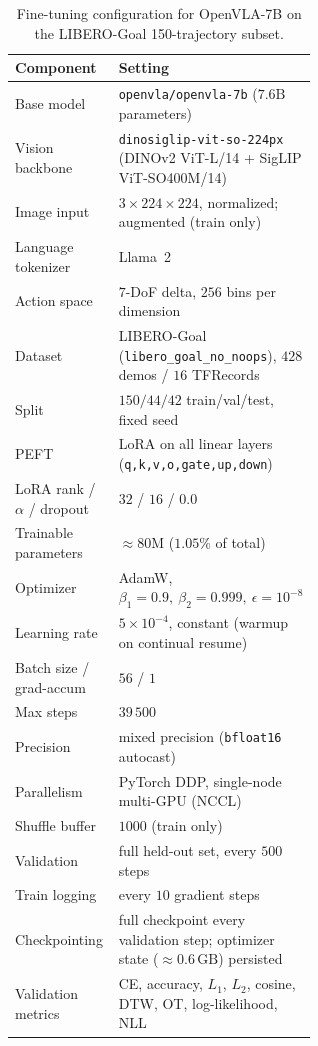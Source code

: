 \documentclass[english,12pt,a4paper,pdftex,elec,utf8]{aaltothesis}
\begin{document}
\begin{table}[t]
  \centering\small
  \caption{Fine-tuning configuration for OpenVLA-7B on the LIBERO-Goal 150-trajectory subset.}
  \label{tab:hparams_openvla-150}
  \begin{tabular}{@{}l p{0.60\linewidth}@{}}
    \toprule
    Component & Setting \\
    \midrule
    Base model              & \texttt{openvla/openvla-7b} ($7.6\text{B}$ parameters) \\
    Vision backbone         & \texttt{dinosiglip-vit-so-224px} (DINOv2 ViT-L/14 + SigLIP ViT-SO400M/14) \\
    Image input             & $3\times224\times224$, normalized; augmented (train only) \\
    Language tokenizer      & Llama~2 \\
    Action space            & $7$-DoF delta, $256$ bins per dimension \\
    Dataset                 & LIBERO-Goal (\texttt{libero\_goal\_no\_noops}), $428$ demos / $16$ TFRecords \\
    Split                   & $150/44/42$ train/val/test, fixed seed \\
    \midrule
    PEFT                    & LoRA on all linear layers (\texttt{q,k,v,o,gate,up,down}) \\
    LoRA rank / $\alpha$ / dropout & $32$ / $16$ / $0.0$ \\
    Trainable parameters    & $\approx\!80\text{M}$ ($1.05\%$ of total) \\
    Optimizer               & AdamW, $\beta_1{=}0.9,\ \beta_2{=}0.999,\ \epsilon{=}10^{-8}$ \\
    Learning rate           & $5\times10^{-4}$, constant (warmup on continual resume) \\
    Batch size / grad-accum & $56$ / $1$ \\
    Max steps               & $39\,500$ \\
    Precision               & mixed precision (\texttt{bfloat16} autocast) \\
    Parallelism             & PyTorch DDP, single-node multi-GPU (NCCL) \\
    \midrule
    Shuffle buffer          & $1000$ (train only) \\
    Validation              & full held-out set, every $500$ steps \\
    Train logging           & every $10$ gradient steps \\
    Checkpointing           & full checkpoint every validation step; optimizer state ($\approx\!0.6\,\text{GB}$) persisted \\
    Validation metrics      & CE, accuracy, $L_1$, $L_2$, cosine, DTW, OT, log-likelihood, NLL \\
    \bottomrule
  \end{tabular}
\end{table}
\end{document}

